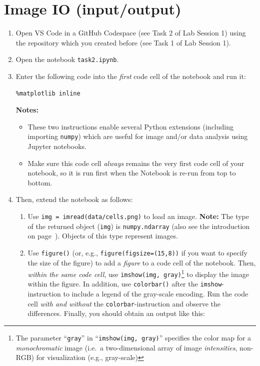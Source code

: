 \documentclass[12pt,a4paper]{article}
\begin{document}
\section{Image IO (input/output)}
\label{task:io}
\begin{enumerate}
    \item Open VS Code in a GitHub Codespace (see Task 2 of Lab Session 1) using the repository which you created before (see Task 1 of Lab Session 1).
    \item Open the notebook \texttt{task2.ipynb}.
    \item Enter the following code into the \emph{first} code cell of the notebook and run it:
\begin{Verbatim}[frame=single]
%pylab
%matplotlib inline
\end{Verbatim}
    \textbf{Notes:}
    \begin{itemize}
        \item These two instructions enable several Python extensions (including importing \texttt{numpy}) which are useful for image and/or data analysis using Jupyter notebooks.
        \item Make sure this code cell \emph{always} remains the very first code cell of your notebook, so it is run first when the Notebook is re-run from top to bottom.
    \end{itemize}
    \item Then, extend the notebook as follows:
    \begin{enumerate}
        \item Use \texttt{img = imread(\textquotesingle{}data/cells.png\textquotesingle)} to load an image. \textbf{Note:} The type of the returned object (\texttt{img}) is \texttt{numpy.ndarray} (also see the introduction on page~\pageref{sec:ndarray}). Objects of this type represent images.
        \item Use \texttt{figure()} (or, e.g., \texttt{figure(figsize=(15,8))} if you want to specify the size of the figure) to add a \emph{figure} to a code cell of the notebook. Then, \emph{within the same code cell}, use \texttt{imshow(img, \textquotesingle{}gray\textquotesingle)}\footnote{The parameter ``\texttt{\textquotesingle{}gray\textquotesingle}'' in ``\texttt{imshow(img, \textquotesingle{}gray\textquotesingle)}'' specifies the color map for a \emph{monochromatic} image (i.e.\ a two-dimensional array of image \emph{intensities}, non-RGB) for visualization (e.g., gray-scale)} to display the image within the figure. In addition, use \texttt{colorbar()} after the \texttt{imshow}-instruction to include a legend of the gray-scale encoding. Run the code cell \emph{with and without} the \texttt{colorbar}-instruction and observe the differences. Finally, you should obtain an output like this:

\end{enumerate}
\end{enumerate}
\end{document}
